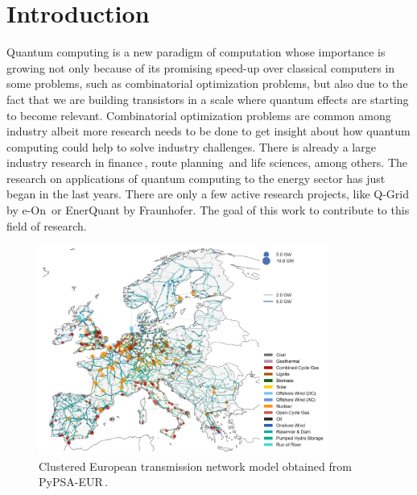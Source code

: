 
\chapter{Introduction} %

\label{Chapter1} %

%
%
Quantum computing is a new paradigm of computation whose importance is growing not only because of its promising speed-up over classical computers in some problems, such as combinatorial optimization problems, but also due to the fact that we are building transistors in a scale where quantum effects are starting to become relevant. Combinatorial optimization problems are common among industry albeit more research needs to be done to get insight about how quantum computing could help to solve industry challenges. There is already a large industry research in finance\,\cite{Herman2022AFinance}, route planning\,\cite{Tambunan2022QuantumSegment} and life sciences, among others. The research on applications of quantum computing to the energy sector has just began in the last years. There are only a few active research projects, like Q-Grid by e-On\,\cite{Fernandez-Campoamor2021CommunityAnnealing} or EnerQuant by Fraunhofer. The goal of this work to contribute to this field of research.
\begin{figure}[H]
  \begin{center}
\includegraphics[width=0.85\textwidth]{Figures/Europe-Grid.png}
  \end{center}
  \caption{Clustered European transmission network model obtained from PyPSA-EUR\,\cite{PyPSA-Eur:PyPSA-Eur}.}
\end{figure}
